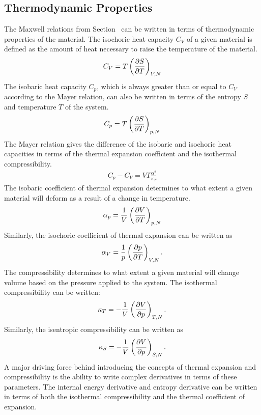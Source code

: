 \subsection{Thermodynamic Properties}\label{thermoprop}
The Maxwell relations from Section~ can be written in terms of thermodynamic properties of the material.  The isochoric heat capacity $C_V$ of a given material is defined as the amount of heat necessary to raise the temperature of the material.
\begin{align}
    C_V = T\left(\pdv{S}{T}\right )_{V,N}
\end{align}
The isobaric heat capacity $C_p$, which is always greater than or equal to $C_V$ according to the Mayer relation, can also be written in terms of the entropy $S$ and temperature $T$ of the system.
\begin{align}
    C_p = T\left(\pdv{S}{T}\right )_{p,N}
\end{align}
The Mayer relation gives the difference of the isobaric and isochoric heat capacities in terms of the thermal expansion coefficient and the isothermal compressibility.
\begin{align}
    C_p - C_V = VT\frac{\alpha^2}{\kappa_T}
\end{align}
The isobaric coefficient of thermal expansion determines to what extent a given material will deform as a result of a change in temperature.
\begin{align}
    \alpha_p = \frac{1}{V}\left( \pdv{V}{T} \right )_{p,N}
\end{align}
Similarly, the isochoric coefficient of thermal expansion can be written as
\begin{align}
    \alpha_V = \frac{1}{p}\left( \pdv{p}{T} \right )_{V,N}.
\end{align}
The compressibility determines to what extent a given material will change volume based on the pressure applied to the system.  The isothermal compressibility can be written:
\begin{align}
    \kappa_T = -\frac{1}{V}\left( \pdv{V}{p} \right )_{T,N}.
\end{align}
Similarly, the isentropic compressibility can be written as
\begin{align}
    \kappa_S = -\frac{1}{V}\left( \pdv{V}{p} \right )_{S,N}.
\end{align}
A major driving force behind introducing the concepts of thermal expansion and compressibility is the ability to write complex derivatives in terms of these parameters. The internal energy derivative and entropy derivative can be written in terms of both the isothermal compressibility and the thermal coefficient of expansion.
